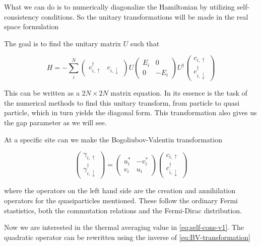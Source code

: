 \documentclass[11pt]{article}
\begin{document}
What we can do is to numerically diagonalize the Hamiltonian by utilizing self-consistency conditions. So the unitary transformations will be made in the real space formulation 

The goal is to find the unitary matrix $U$ such that

\begin{equation}
	H = - \sum_{i}^{N} \begin{pmatrix} c_{i, \uparrow}^\dagger &  c_{i, \downarrow} \end{pmatrix} U \begin{pmatrix} E_i & 0 \\ 0 & -E_i \end{pmatrix} U^\dagger  \begin{pmatrix} c_{i, \uparrow} \\  c_{i, \downarrow}^\dagger \end{pmatrix}
\end{equation}

This can be written as a $2N \times 2N$ matrix equation. In its essence is the task of the numerical methods to find this unitary transform, from particle to quasi particle, which in turn yields the diagonal form. This transformation also gives us the gap parameter as we will see. 

At a specific site can we make the Bogoliubov-Valentin transformation

\begin{equation}\label{eq:BV-transformation}
	\begin{pmatrix} \gamma_{i,\uparrow} \\ \gamma_{i, \downarrow}^\dagger \end{pmatrix} = \begin{pmatrix} u_i^{*} & -v_i^* \\ v_i & u_i \end{pmatrix} \begin{pmatrix} c_{i,\uparrow} \\ c_{i,\downarrow}^\dagger \end{pmatrix} 
\end{equation}

where the operators on the left hand side are the creation and annihilation operators for the quasiparticles mentioned. These follow the ordinary Fermi stastistics, both the commutation relations and the Fermi-Dirac distribution. 

Now we are interested in the thermal averaging value in \eqref{eq:self-cons-v1}. The quadratic operator can be rewritten using the inverse of \eqref{eq:BV-transformation}
\end{document}
